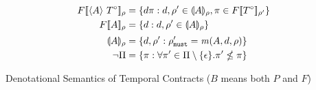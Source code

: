 {\begin{align*}
      \\
     F[\![ \langle A\rangle\ T^\circ ]\!]_{\rho} &=
     \left\{d \pi : d,\rho' \in \llparenthesis A \rrparenthesis_{\rho}, \pi \in F[\![ T^\circ ]\!]_{\rho'}\right\}
     \\
      F[\![ A ]\!]_{\rho} &= \left\{d : d,\rho' \in \llparenthesis A \rrparenthesis_{\rho}\right\}
      \\[2pt]
      \llparenthesis A \rrparenthesis_{\rho} &= \left\{d,\rho' : \rho'_{\tt must} = \mathit{m}(A, d, \rho)\right\}
      \\
      \neg \Pi &= \left\{\pi : \forall \pi' \in
        \Pi\setminus\{\epsilon\}. \pi' \nleq \pi\right\}
    \end{align*}}{\caption{Denotational Semantics of Temporal Contracts ($B$ means both $P$ and $F$)}\label{fig:tcontract-denotation}}
